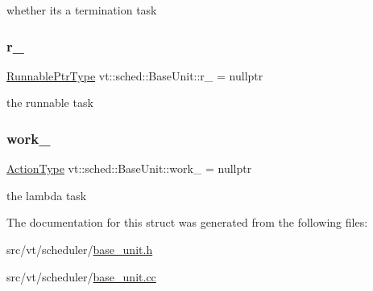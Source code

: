 whether it\textquotesingle{}s a termination task \mbox{\label{structvt_1_1sched_1_1_base_unit_a0d126796f0ee5a8e0f3304e6ca02d0fc}} 
\subsubsection{\texorpdfstring{r\+\_\+}{r\_}}
{\footnotesize\ttfamily \hyperlink{structvt_1_1sched_1_1_base_unit_a9be5d5adaeb011c8ef82f751485ebf9a}{Runnable\+Ptr\+Type} vt\+::sched\+::\+Base\+Unit\+::r\+\_\+ = nullptr\hspace{0.3cm}{\ttfamily [protected]}}

the runnable task \mbox{\label{structvt_1_1sched_1_1_base_unit_ab425435c3b6c1cdf2fc208f1e50ea84c}} 
\subsubsection{\texorpdfstring{work\+\_\+}{work\_}}
{\footnotesize\ttfamily \hyperlink{namespacevt_ae0a5a7b18cc99d7b732cb4d44f46b0f3}{Action\+Type} vt\+::sched\+::\+Base\+Unit\+::work\+\_\+ = nullptr\hspace{0.3cm}{\ttfamily [protected]}}

the lambda task 

The documentation for this struct was generated from the following files\+:\begin{DoxyCompactItemize}
\item 
src/vt/scheduler/\hyperlink{base__unit_8h}{base\+\_\+unit.\+h}\item 
src/vt/scheduler/\hyperlink{base__unit_8cc}{base\+\_\+unit.\+cc}\end{DoxyCompactItemize}
